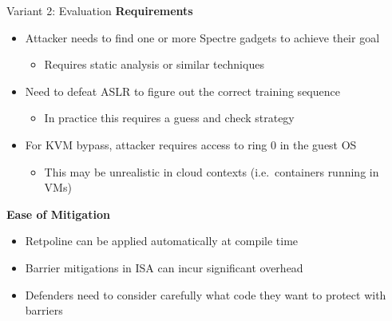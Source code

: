 \documentclass[10pt, dvipsnames, aspectratio=169]{beamer}
\begin{document}
\begin{frame}[c, fragile]{Variant 2: Evaluation}{}
  {\bf Requirements}
  \begin{itemize}
    \item Attacker needs to find one or more Spectre gadgets to achieve their goal
    \begin{itemize}
      \item Requires static analysis or similar techniques
    \end{itemize}
    \item Need to defeat ASLR to figure out the correct training sequence
    \begin{itemize}
      \item In practice this requires a guess and check strategy
    \end{itemize}
    \item For KVM bypass, attacker requires access to ring 0 in the guest OS
    \begin{itemize}
      \item This may be unrealistic in cloud contexts (i.e.~containers running in VMs)
    \end{itemize}
  \end{itemize}

  \vfill
  {\bf Ease of Mitigation}
  \begin{itemize}
    \item Retpoline can be applied automatically at compile time
    \item Barrier mitigations in ISA can incur significant overhead
    \item Defenders need to consider carefully what code they want to protect with barriers
  \end{itemize}
\end{frame}
\end{document}
